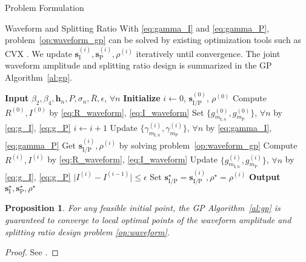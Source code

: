 \documentclass[journal]{IEEEtran}
\newtheorem{proposition}{Proposition}
\begin{document}
\begin{section}{Problem Formulation}
\begin{subsection}{Waveform and Splitting Ratio}
			With \eqref{eq:gamma_I} and \eqref{eq:gamma_P}, problem~\eqref{op:waveform_gp} can be solved by existing optimization tools such as CVX \cite{Grant2008}. We update $\boldsymbol{s}_{\mathrm{I}}^{(i)},\boldsymbol{s}_\mathrm{P}^{(i)},\rho^{(i)}$ iteratively until convergence. The joint waveform amplitude and splitting ratio design is summarized in the GP Algorithm~\ref{al:gp}.
			\begin{algorithm}[!t]
				\caption{GP: Waveform Amplitude and Splitting Ratio.}
				\label{al:gp}
				\begin{algorithmic}[1]
					\State \textbf{Input} $\beta_2,\beta_4,\boldsymbol{h}_n,P,\sigma_n,\bar{R},\epsilon$, $\forall n$
					\State \textbf{Initialize} $i \gets 0$, $\boldsymbol{s}_{\mathrm{I/P}}^{(0)}$, $\rho^{(0)}$
					\State Compute $R^{(0)},I^{(0)}$ by \eqref{eq:R_waveform}, \eqref{eq:I_waveform}
					\State Set $\{g_{m_{\mathrm{I},n}}^{(0)},g_{m_\mathrm{P}}^{(0)}\}$, $\forall n$ by \eqref{eq:g_I}, \eqref{eq:g_P}
					\Repeat
						\State $i \gets i + 1$
						\State Update $\{\gamma_{m_{\mathrm{I},n}}^{(i)},\gamma_{m_\mathrm{P}}^{(i)}\}$, $\forall n$ by \eqref{eq:gamma_I}, \eqref{eq:gamma_P}
						\State Get $\boldsymbol{s}_{\mathrm{I/P}}^{(i)},\rho^{(i)}$ by solving problem~\eqref{op:waveform_gp}
						\State Compute $R^{(i)},I^{(i)}$ by \eqref{eq:R_waveform}, \eqref{eq:I_waveform}
						\State Update $\{g_{m_{\mathrm{I},n}}^{(i)},g_{m_\mathrm{P}}^{(i)}\}$, $\forall n$ by \eqref{eq:g_I}, \eqref{eq:g_P}
					\Until $\lvert I^{(i)} - I^{(i-1)} \rvert \le \epsilon$
					\State Set $\boldsymbol{s}_{\mathrm{I/P}}^{\star}=\boldsymbol{s}_{\mathrm{I/P}}^{(i)},\rho^{\star}=\rho^{(i)}$
					\State \textbf{Output} $\boldsymbol{s}_{\mathrm{I}}^{\star},\boldsymbol{s}_{\mathrm{P}}^{\star},\rho^{\star}$
				\end{algorithmic}
			\end{algorithm}

			\begin{proposition}\label{pr:gp}
				For any feasible initial point, the GP Algorithm~\ref{al:gp} is guaranteed to converge to local optimal points of the waveform amplitude and splitting ratio design problem \eqref{op:waveform}.
			\end{proposition}

			\begin{proof}\label{pf:gp}
				See \cite{Clerckx2016a,Clerckx2018b}.
			\end{proof}
		\end{subsection}



\end{section}
\end{document}
